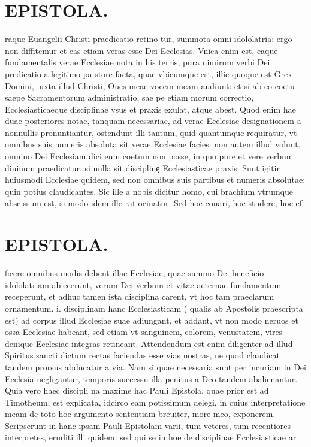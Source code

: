 \documentclass{article}
\begin{document}
\begin{pages}
\section*{EPISTOLA. }\pstart raque Euangelii Christi praedicatio retino tur, summota omni idololatria: ergo non diffitemur et eas etiam veras esse Dei Ecclesias. Vnica enim est, eaque fundamentalis verae Ecclesiae nota in his terris, pura nimirum verbi Dei predicatio a legitimo pa store facta, quae vbicumque est, illic quoque est Grex Domini, iuxta illud Christi, Oues meae vocem meam audiunt: et si ab eo coetu saepe Sacramentorum administratio, sae pe etiam morum correctio, Ecclesiasticaeque disciplinae vsus et praxis exulat, atque abest. Quod enim hae duae posteriores notae, tanquam necessariae, ad verae Ecclesiae designationem a nonnullis pronuntiantur, ostendunt illi tantum, quid quantumque requiratur, vt omnibus suis numeris absoluta sit verae Ecclesiae facies. non autem illud volunt, omnino Dei Ecclesiam dici eum coetum non posse, in quo pure et vere verbum diuinum praedicatur, si nulla sit disciplinȩ Ecclesiasticae praxis. Sunt igitir huiusmodi Ecclesiae quidem, sed non omnibus suis partibus et numeris absolutae: quin potius claudicantes. Sic ille a nobis dicitur homo, cui brachium vtrumque abscissum est, si modo idem ille ratiocinatur. Sed hoc conari, hoc studere, hoc ef\pend
\section*{EPISTOLA. }\pstart ficere omnibus modis debent illae Ecclesiae, quae summo Dei beneficio idololatriam abiecerunt, verum Dei verbum et vitae aeternae fundamentum receperunt, et adhuc tamen ista disciplina carent, vt hoc tam praeclarum ornamentum. i. disciplinam hanc Ecclesiasticam ( qualis ab Apostolis praescripta est) ad corpus illud Ecclesiae suae adiungant, et addant, vt non modo neruos et ossa Ecclesiae habeant, sed etiam vt sanguinem, colorem, venustatem, vires denique Ecclesiae integras retineant. Attendendum est enim diligenter ad illud Spiritus sancti dictum rectas faciendas esse vias nostras, ne quod claudicat tandem prorsus abducatur a via. Nam si quae necessaria sunt per incuriam in Dei Ecclesia negligantur, temporis successu illa penitus a Deo tandem abalienantur. Quia vero haec discipli na maxime hac Pauli Epistola, quae prior est ad Timotheum, est explicata, idcirco eam potissimum delegi, in cuius interpretatione meam de toto hoc argumento sententiam breuiter, more meo, exponerem. Scripserunt in hanc ipsam Pauli Epistolam varii, tum veteres, tum recentiores interpretes, eruditi illi quidem: sed qui se in hoe de disciplinae Ecclesiasticae ar\pend

\end{pages}
\end{document}
